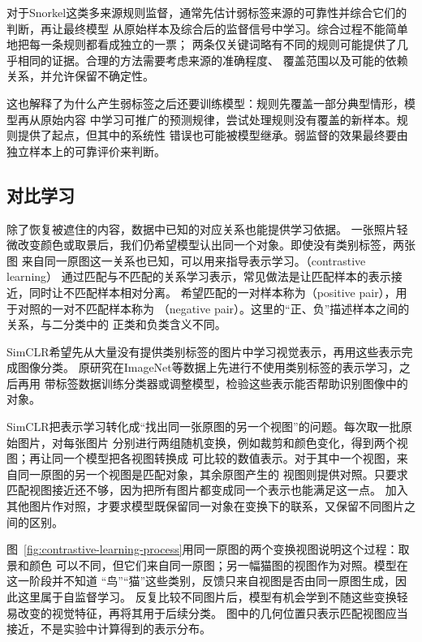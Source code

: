 对于Snorkel这类多来源规则监督，通常先估计弱标签来源的可靠性并综合它们的判断，再让最终模型
从原始样本及综合后的监督信号中学习。综合过程不能简单地把每一条规则都看成独立的一票；
两条仅关键词略有不同的规则可能提供了几乎相同的证据。合理的方法需要考虑来源的准确程度、
覆盖范围以及可能的依赖关系，并允许保留不确定性。

这也解释了为什么产生弱标签之后还要训练模型：规则先覆盖一部分典型情形，模型再从原始内容
中学习可推广的预测规律，尝试处理规则没有覆盖的新样本。规则提供了起点，但其中的系统性
错误也可能被模型继承。弱监督的效果最终要由独立样本上的可靠评价来判断。

\subsection{对比学习}
\label{sec:contrastive-learning}

除了恢复被遮住的内容，数据中已知的对应关系也能提供学习依据。
一张照片轻微改变颜色或取景后，我们仍希望模型认出同一个对象。即使没有类别标签，两张图
来自同一原图这一关系也已知，可以用来指导表示学习。（contrastive learning）
通过匹配与不匹配的关系学习表示，常见做法是让匹配样本的表示接近，同时让不匹配样本相对分离。
希望匹配的一对样本称为（positive pair），用于对照的一对不匹配样本称为
（negative pair）。这里的“正、负”描述样本之间的关系，与二分类中的
正类和负类含义不同。

SimCLR希望先从大量没有提供类别标签的图片中学习视觉表示，再用这些表示完成图像分类。
原研究在ImageNet等数据上先进行不使用类别标签的表示学习，之后再用
带标签数据训练分类器或调整模型，检验这些表示能否帮助识别图像中的对象。

SimCLR把表示学习转化成“找出同一张原图的另一个视图”的问题。每次取一批原始图片，对每张图片
分别进行两组随机变换，例如裁剪和颜色变化，得到两个视图；再让同一个模型把各视图转换成
可比较的数值表示。对于其中一个视图，来自同一原图的另一个视图是匹配对象，其余原图产生的
视图则提供对照。只要求匹配视图接近还不够，因为把所有图片都变成同一个表示也能满足这一点。
加入其他图片作对照，才要求模型既保留同一对象在变换下的联系，又保留不同图片之间的区别。

图~\ref{fig:contrastive-learning-process}用同一原图的两个变换视图说明这个过程：取景和颜色
可以不同，但它们来自同一原图；另一幅猫图的视图作为对照。模型在这一阶段并不知道
“鸟”“猫”这些类别，反馈只来自视图是否由同一原图生成，因此这里属于自监督学习。
反复比较不同图片后，模型有机会学到不随这些变换轻易改变的视觉特征，再将其用于后续分类。
图中的几何位置只表示匹配视图应当接近，不是实验中计算得到的表示分布。

